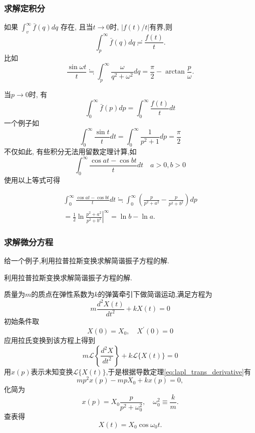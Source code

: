 \subsubsection{求解定积分}
如果 $\int_v^{\infty} \bar{f}(q) d q$ 存在, 且当$t\to 0$时, $|f(t)/t|$有界,则
\begin{equation}
    \int_{p}^{\infty} \bar{f}(q) dq \risingdotseq \frac{f(t)}{t} . 
\end{equation}
比如
$$
\frac{\sin \omega t}{t} \fallingdotseq \int_p^{\infty} \frac{\omega}{q^2+\omega^2} d q=\frac{\pi}{2}-\arctan \frac{p}{\omega}.
$$

当$p\to 0$时, 有
\begin{equation}
    \int_0^{\infty} \bar{f}(p) d p=\int_0^{\infty} \frac{f(t)}{t} d t
\end{equation}
一个例子如
$$
\int_0^{\infty} \frac{\sin t}{t} d t=\int_0^{\infty} \frac{1}{p^2+1} d p=\frac{\pi}{2}
$$
不仅如此, 有些积分无法用留数定理计算,如
$$
\int_0^{\infty} \frac{\cos a t-\cos b t}{t} d t \quad a>0, b>0
$$
使用以上等式可得

$$
\begin{gathered}
\int_0^{\infty} \frac{\cos a t-\cos b t}{t} d t \fallingdotseq \int_0^{\infty}\left(\frac{p}{p^2+a^2}-\frac{p}{p^2+b^2}\right) d p \\
=\left.\frac{1}{2} \ln \frac{p^2+a^2}{p^2+b^2}\right|^{\infty}=\ln b-\ln a .
\end{gathered}
$$

\subsubsection{求解微分方程}
给一个例子,利用拉普拉斯变换求解简谐振子方程的解.
\begin{example}
利用拉普拉斯变换求解简谐振子方程的解.
\end{example}
\begin{solution}
    质量为$m$的质点在弹性系数为$k$的弹簧牵引下做简谐运动,满足方程为
    $$
m \frac{d^2 X(t)}{d t^2}+k X(t)=0
$$
初始条件取
$$
X(0)=X_0, \quad X^{\prime}(0)=0
$$
应用拉氏变换到该方程上得到
$$
m \mathcal{L}\left\{\frac{d^2 X}{d t^2}\right\}+k \mathcal{L}\{X(t)\}=0
$$
用$x(p)$表示未知变换$\mathcal{L}\{ X(t)\}$,于是根据导数定理\eqref{eq:lapl_trans_derivative}有
$$
m p^2 x(p)-m p X_0+k x(p)=0,
$$
化简为
$$
x(p)=X_0 \frac{p}{p^2+\omega_0^2}, \quad \omega_0^2 \equiv \frac{k}{m} .
$$
查表得
$$
X(t)=X_0 \cos \omega_0 t.
$$
\end{solution}